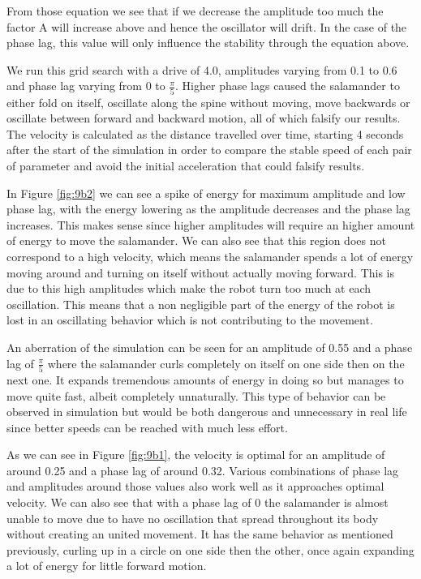 \documentclass{cmc}
\begin{document}
From those equation we see that if we decrease the amplitude too much the factor A will increase above and hence the oscillator will drift. 
In the case of the phase lag, this value will only influence the stability through the equation above. 

We run this grid search with a drive of 4.0, amplitudes varying from 0.1 to 0.6 and phase lag varying from 0 to $\frac{\pi}{5} $. Higher phase lags caused the salamander to either fold on itself, oscillate along the spine without moving, move backwards or oscillate between forward and backward motion, all of which falsify our results. The velocity is calculated as the distance travelled over time, starting 4 seconds after the start of the simulation in order to compare the stable speed of each pair of parameter and avoid the initial acceleration that could falsify results.

In Figure \ref{fig:9b2} we can see a spike of energy for maximum amplitude and low phase lag, with the energy lowering as the amplitude decreases and the phase lag increases. This makes sense since higher amplitudes will require an higher amount of energy to move the salamander. We can also see that this region does not correspond to a high velocity, which means the salamander spends a lot of energy moving around and turning on itself without actually moving forward. This is due to this high amplitudes which make the robot turn too much at each oscillation. This means that a non negligible part of the energy of the robot is lost in an oscillating behavior which is not contributing to the movement.

An aberration of the simulation can be seen for an amplitude of 0.55 and a phase lag of $\frac{\pi}{5} $ where the salamander curls completely on itself on one side then on the next one. It expands tremendous amounts of energy in doing so but manages to move quite fast, albeit completely unnaturally. This type of behavior can be observed in simulation but would be both dangerous and unnecessary in real life since better speeds can be reached with much less effort.

As we can see in Figure \ref{fig:9b1}, the velocity is optimal for an amplitude of around 0.25 and a phase lag of around 0.32. Various combinations of phase lag and amplitudes around those values also work well as it approaches optimal velocity. We can also see that with a phase lag of 0 the salamander is almost unable to move due to have no oscillation that spread throughout its body without creating an united movement. It has the same behavior as mentioned previously, curling up in a circle on one side then the other, once again expanding a lot of energy for little forward motion.
\end{document}
